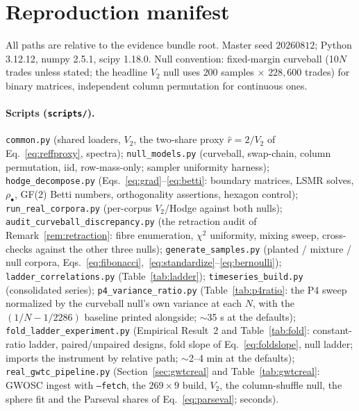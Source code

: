 \documentclass[11pt,a4paper]{article}
\theoremstyle{plain}
\theoremstyle{remark}
\theoremstyle{plain}
\begin{document}
\appendix

\section{Reproduction manifest}
\label{app:manifest}

All paths are relative to the evidence bundle root. Master seed $20260812$; Python 3.12.12, numpy 2.5.1, scipy 1.18.0. Null convention: fixed-margin curveball (10$N$ trades unless stated; the headline $V_2$ null uses $200$ samples $\times$ $228{,}600$ trades) for binary matrices, independent column permutation for continuous ones.

\paragraph{Scripts (\texttt{scripts/}).}
\texttt{common.py} (shared loaders, $V_2$, the two-share proxy $\hat r=2/V_2$ of Eq.~\eqref{eq:reffproxy}, spectra);
\texttt{null\_models.py} (curveball, swap-chain, column permutation, iid, row-mass-only; sampler uniformity harness);
\texttt{hodge\_decompose.py} (Eqs.~\eqref{eq:grad}--\eqref{eq:betti}: boundary matrices, LSMR solves, $\rho_\bullet$, GF(2) Betti numbers, orthogonality assertions, hexagon control);
\texttt{run\_real\_corpora.py} (per-corpus $V_2$/Hodge against both nulls);
\texttt{audit\_curveball\_discrepancy.py} (the retraction audit of Remark~\ref{rem:retraction}: fibre enumeration, $\chi^2$ uniformity, mixing sweep, cross-checks against the other three nulls);
\texttt{generate\_samples.py} (planted / mixture / null corpora, Eqs.~\eqref{eq:fibonacci},~\eqref{eq:standardize}--\eqref{eq:bernoulli});
\texttt{ladder\_correlations.py} (Table~\ref{tab:ladder});
\texttt{timeseries\_build.py} (consolidated series);
\texttt{p4\_variance\_ratio.py} (Table~\ref{tab:p4ratio}: the P4 sweep normalized by the curveball null's own variance at each $N$, with the $(1/N-1/2286)$ baseline printed alongside; $\sim$35 s at the defaults);
\texttt{fold\_ladder\_experiment.py} (Empirical Result~2 and Table~\ref{tab:fold}: constant-ratio ladder, paired/unpaired designs, fold slope of Eq.~\eqref{eq:foldslope}, null ladder; imports the instrument by relative path; $\sim$2--4 min at the defaults);
\texttt{real\_gwtc\_pipeline.py} (Section~\ref{sec:gwtcreal} and Table~\ref{tab:gwtcreal}: GWOSC ingest with \texttt{--fetch}, the $269\times9$ build, $V_2$, the column-shuffle null, the sphere fit and the Parseval shares of Eq.~\eqref{eq:parseval}; seconds).
\end{document}
